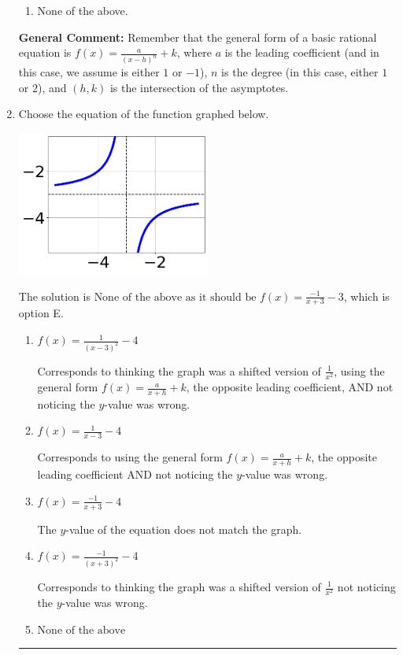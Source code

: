 \documentclass{extbook}[14pt]
\newcommand{\litem}[1]{\item #1

\rule{\textwidth}{0.4pt}}
\begin{document}
\begin{enumerate}
{\begin{enumerate}[label=\Alph*.]
\begin{multicols}{2}
\end{multicols}\item None of the above.\end{enumerate}
\textbf{General Comment:} Remember that the general form of a basic rational equation is $ f(x) = \frac{a}{(x-h)^n} + k$, where $a$ is the leading coefficient (and in this case, we assume is either $1$ or $-1$), $n$ is the degree (in this case, either $1$ or $2$), and $(h, k)$ is the intersection of the asymptotes.
}
\litem{
Choose the equation of the function graphed below.

\begin{center}
    \includegraphics[width=0.5\textwidth]{../Figures/rationalGraphToEquationB.png}
\end{center}


The solution is \( \text{None of the above as it should be } f(x) = \frac{-1}{x + 3} - 3 \), which is option E.\begin{enumerate}[label=\Alph*.]
\item \( f(x) = \frac{1}{(x - 3)^2} - 4 \)

Corresponds to thinking the graph was a shifted version of $\frac{1}{x^2}$, using the general form $f(x) = \frac{a}{x+h}+k$, the opposite leading coefficient, AND not noticing the $y$-value was wrong.
\item \( f(x) = \frac{1}{x - 3} - 4 \)

Corresponds to using the general form $f(x) = \frac{a}{x+h}+k$, the opposite leading coefficient AND not noticing the $y$-value was wrong.
\item \( f(x) = \frac{-1}{x + 3} - 4 \)

The $y$-value of the equation does not match the graph.
\item \( f(x) = \frac{-1}{(x + 3)^2} - 4 \)

Corresponds to thinking the graph was a shifted version of $\frac{1}{x^2}$ not noticing the $y$-value was wrong.
\item \( \text{None of the above} \)


\end{enumerate}}
\end{enumerate}
\end{document}
